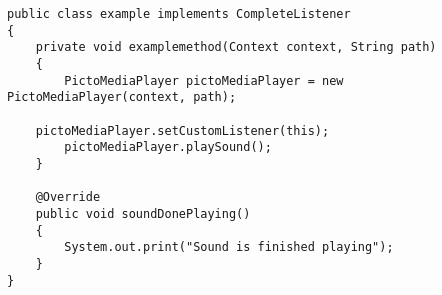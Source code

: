 \begin{lstlisting}[caption={Example of PictoMediaPlayer.},label={lst:mediaplayerexample}]
public class example implements CompleteListener
{
    private void examplemethod(Context context, String path)
    {
        PictoMediaPlayer pictoMediaPlayer = new PictoMediaPlayer(context, path);

	pictoMediaPlayer.setCustomListener(this);
        pictoMediaPlayer.playSound();
    }

    @Override
    public void soundDonePlaying()
    {
        System.out.print("Sound is finished playing");
    }
}
\end{lstlisting}





